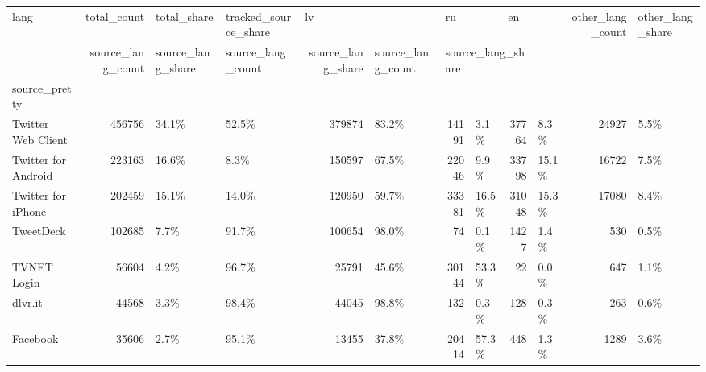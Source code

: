 \begin{tabular}{lrllrlrlrlrl}
\toprule
lang & total\_count & total\_share & tracked\_source\_share & \multicolumn{2}{l}{lv} & \multicolumn{2}{l}{ru} & \multicolumn{2}{l}{en} & other\_lang\_count & other\_lang\_share \\
{} & source\_lang\_count & source\_lang\_share & source\_lang\_count & source\_lang\_share & source\_lang\_count & \multicolumn{3}{l}{source\_lang\_share} \\
source\_pretty       &             &             &                      &                   &                   &                   &                   &                   &                   &                  &                  \\
\midrule
Twitter Web Client  &      456756 &       34.1\% &                52.5\% &            379874 &             83.2\% &             14191 &              3.1\% &             37764 &              8.3\% &            24927 &             5.5\% \\
Twitter for Android &      223163 &       16.6\% &                 8.3\% &            150597 &             67.5\% &             22046 &              9.9\% &             33798 &             15.1\% &            16722 &             7.5\% \\
Twitter for iPhone  &      202459 &       15.1\% &                14.0\% &            120950 &             59.7\% &             33381 &             16.5\% &             31048 &             15.3\% &            17080 &             8.4\% \\
TweetDeck           &      102685 &        7.7\% &                91.7\% &            100654 &             98.0\% &                74 &              0.1\% &              1427 &              1.4\% &              530 &             0.5\% \\
TVNET Login         &       56604 &        4.2\% &                96.7\% &             25791 &             45.6\% &             30144 &             53.3\% &                22 &              0.0\% &              647 &             1.1\% \\
dlvr.it             &       44568 &        3.3\% &                98.4\% &             44045 &             98.8\% &               132 &              0.3\% &               128 &              0.3\% &              263 &             0.6\% \\
Facebook            &       35606 &        2.7\% &                95.1\% &             13455 &             37.8\% &             20414 &             57.3\% &               448 &              1.3\% &             1289 &             3.6\% \\

\end{tabular}
